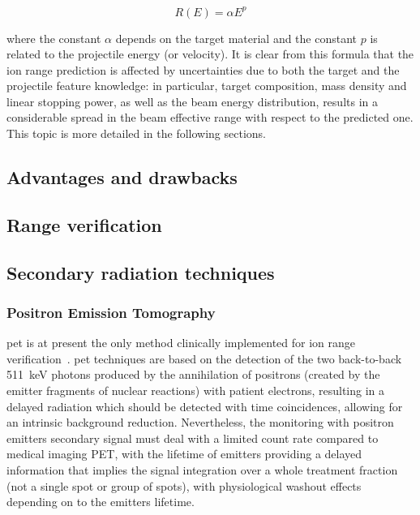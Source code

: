 \begin{equation}
R(E) = \alpha E^{p}
\label{chap1::eq::rangePowerLaw}
\end{equation}

where the constant $\alpha$ depends on the target material and the constant $p$ is related to the projectile energy (or velocity). It is clear from this formula that the ion range prediction is affected by uncertainties due to both the target and the projectile feature knowledge: in particular, target composition, mass density and linear stopping power, as well as the beam energy distribution, results in a considerable spread in the beam effective range with respect to the predicted one. This topic is more detailed in the following sections.



\subsection{Advantages and drawbacks}

\subsection{Range verification}

\subsection{Secondary radiation techniques}

\subsubsection{Positron Emission Tomography}
\gls{pet} is at present the only method clinically implemented for ion range verification~\parencite{Hishikawa2002, Enghardt2004, Parodi2007, Bauer2013}. \gls{pet} techniques are based on the detection of the two back-to-back 511~keV photons produced by the annihilation of positrons (created by the emitter fragments of nuclear reactions) with patient electrons, resulting in a delayed radiation which should be detected with time coincidences, allowing for an intrinsic background reduction. Nevertheless, the monitoring with positron emitters secondary signal must deal with a limited count rate compared to medical imaging PET, with the lifetime of emitters providing a delayed information that implies the signal integration over a whole treatment fraction (not a single spot or group of spots), with physiological washout effects depending on to the emitters lifetime.


